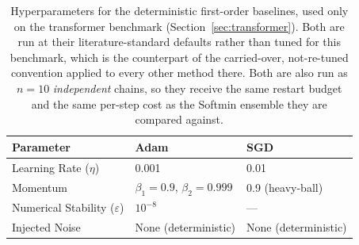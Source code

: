 \documentclass{article}
\theoremstyle{plain}
\theoremstyle{definition}
\theoremstyle{remark}
\begin{document}
\begin{table}[!htbp]
\centering
\caption{Hyperparameters for the deterministic first-order baselines, used only on the transformer
benchmark (Section~\ref{sec:transformer}). Both are run at their literature-standard defaults
rather than tuned for this benchmark, which is the counterpart of the carried-over,
not-re-tuned convention applied to every other method there. Both are also run as $n=10$
\emph{independent} chains, so they receive the same restart budget and the same per-step cost as
the Softmin ensemble they are compared against.}
\label{tab:adam_sgd_hyperparams}
\begin{tabular}{@{}lll@{}}
\toprule
\textbf{Parameter} & \textbf{Adam} & \textbf{SGD} \\
\midrule
Learning Rate ($\eta$) & 0.001 & 0.01 \\
Momentum & $\beta_1=0.9$, $\beta_2=0.999$ & 0.9 (heavy-ball) \\
Numerical Stability ($\varepsilon$) & $10^{-8}$ & --- \\
Injected Noise & None (deterministic) & None (deterministic) \\
\bottomrule
\end{tabular}
\end{table}
\end{document}
